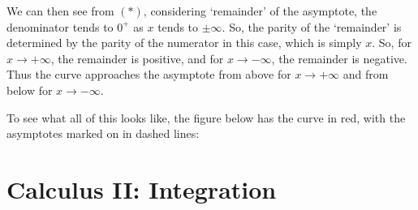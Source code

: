 \documentclass[11pt, a4paper]{article}
\begin{document}
We can then see from $(*)$, considering `remainder' of the asymptote, the denominator tends to $0^{+}$ as $x$ tends to $\pm\infty$. So, the parity of the `remainder' is determined by the parity of the numerator in this case, which is simply $x$. So, for $x\rightarrow+\infty$, the remainder is positive, and for $x\rightarrow-\infty$, the remainder is negative. Thus the curve approaches the asymptote from above for $x\rightarrow+\infty$ and from below for $x\rightarrow-\infty$. \newline \par

To see what all of this looks like, the figure below has the curve in red, with the asymptotes marked on in dashed lines:

\begin{figure}[H]
\centering
\begin{subfigure}[b]{0.89\textwidth}
\centering
{}
\end{subfigure}
\end{figure}

\vspace{0.5cm}



\clearpage
\section{Calculus II: Integration}
\vspace{0.5cm}
\end{document}
